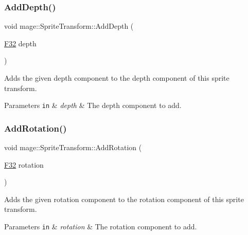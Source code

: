 \subsubsection{\texorpdfstring{Add\+Depth()}{AddDepth()}}
{\footnotesize\ttfamily void mage\+::\+Sprite\+Transform\+::\+Add\+Depth (\begin{DoxyParamCaption}\item[{\mbox{\hyperlink{namespacemage_aa97e833b45f06d60a0a9c4fc22ae02c0}{F32}}}]{depth }\end{DoxyParamCaption})\hspace{0.3cm}{\ttfamily [noexcept]}}

Adds the given depth component to the depth component of this sprite transform.


\begin{DoxyParams}[1]{Parameters}
\mbox{\tt in}  & {\em depth} & The depth component to add. \\
\hline
\end{DoxyParams}
\mbox{\label{classmage_1_1_sprite_transform_ab189a29372631e74ae5f638243eaa312}} 
\subsubsection{\texorpdfstring{Add\+Rotation()}{AddRotation()}}
{\footnotesize\ttfamily void mage\+::\+Sprite\+Transform\+::\+Add\+Rotation (\begin{DoxyParamCaption}\item[{\mbox{\hyperlink{namespacemage_aa97e833b45f06d60a0a9c4fc22ae02c0}{F32}}}]{rotation }\end{DoxyParamCaption})\hspace{0.3cm}{\ttfamily [noexcept]}}

Adds the given rotation component to the rotation component of this sprite transform.


\begin{DoxyParams}[1]{Parameters}
\mbox{\tt in}  & {\em rotation} & The rotation component to add. \\
\hline
\end{DoxyParams}
\mbox{\label{classmage_1_1_sprite_transform_adc0912e49d43143f7fe5c8fc1c25dacf}} 
